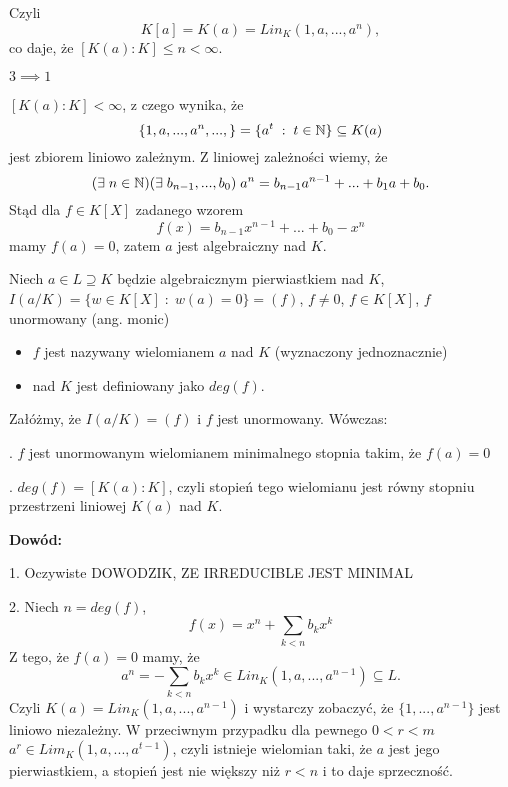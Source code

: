 Czyli 
$$K[a]=K(a)=Lin_K(1,a,...,a^n),$$ 
co daje, że $[K(a):K]\leq n<\infty$.

$3\implies 1$

$[K(a):K]<\infty$, z czego wynika, że
$$\{1,a,...,a^n,...,\}=\{a^t\;:\;t\in\mathbb{N}\}\subseteq K(a)$$
jest zbiorem liniowo zależnym. Z liniowej zależności wiemy, że
$$(\exists\;n\in\mathbb{N})(\exists\;b_{n-1},...,b_0)\;a^{n}=b_{n-1}a^{n-1}+...+b_1a+b_0.$$
Stąd dla $f\in K[X]$ zadanego wzorem
$$f(x)=b_{n-1}x^{n-1}+...+b_0-x^n$$
mamy $f(a)=0$, zatem $a$ jest algebraiczny nad $K$.
\medskip

\begin{definicja}
Niech $a\in L\supseteq K$ będzie algebraicznym pierwiastkiem nad $K$, $I(a/K)=\{w\in K[X]\;:\;w(a)=0\}=(f)$, $f\neq 0$, $f\in K[X]$, $f$ unormowany (ang. monic)
\begin{itemize}
    \item[\point] $f$ jest nazywany wielomianem  $a$ nad $K$ (wyznaczony jednoznacznie)
    \item[\point]  nad $K$ jest definiowany jako $deg(f)$.
\end{itemize}
\end{definicja}


\begin{uwaga}[$I(a/K)=(f)\implies deg(f)=\begin{bmatrix}K(a):K\end{bmatrix}$]
    Załóżmy, że $I(a/K)=(f)$ i $f$ jest unormowany. Wówczas:

    . $f$ jest unormowanym wielomianem minimalnego stopnia takim, że $f(a)=0$

    . $deg(f)=[K(a):K]$, czyli stopień tego wielomianu jest równy stopniu przestrzeni liniowej $K(a)$ nad $K$.
\end{uwaga}

\textbf{Dowód:}

1. Oczywiste {\large\color{orange}DOWODZIK, ZE IRREDUCIBLE JEST MINIMAL}

2. Niech $n=deg(f)$, 
$$f(x)=x^n+\sum\limits_{k<n}b_kx^k$$
Z tego, że $f(a)=0$ mamy, że 
$$a^n=-\sum\limits_{k<n}b_kx^k\in Lin_K(1,a,...,a^{n-1})\subseteq L.$$
Czyli $K(a)=Lin_K(1,a,...,a^{n-1})$ i wystarczy zobaczyć, że $\{1,..., a^{n-1}\}$ jest liniowo niezależny. W przeciwnym przypadku dla pewnego $0<r<m$ $a^r\in Lim_K(1,a,...,a^{t-1})$, czyli istnieje wielomian taki, że $a$ jest jego pierwiastkiem, a stopień jest nie większy niż $r<n$ i to daje sprzeczność.

